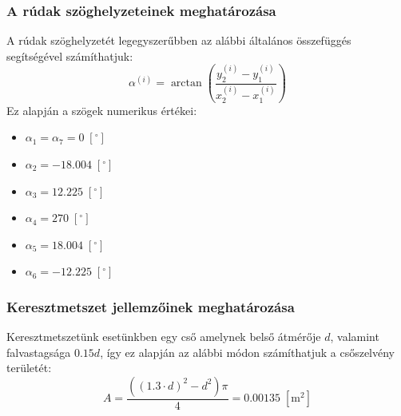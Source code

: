 \documentclass[12pt,a4paper]{article}
\def\deg{\; \left[^{\circ}\right]}
\def\mm{\; \left[\mathrm{m^2}\right]}
\begin{document}
\subsubsection{A rúdak szöghelyzeteinek meghatározása}
A rúdak szöghelyzetét legegyszerűbben az alábbi általános összefüggés
segítségével számíthatjuk:
\begin{equation}
    \boxed{\alpha^{\left(i\right)}=
        \arctan \left( \frac{y^{\left(i\right)}_2-y^{\left(i\right)}_1}
        {x^{\left(i\right)}_2-x^{\left(i\right)}_1}\right)}
\end{equation}
Ez alapján a szögek numerikus értékei:
\begin{multicols}{3}
    \begin{itemize}
        \item $\alpha_1=\alpha_7=0 \deg$
        \item $\alpha_2=-18.004 \deg$
    \end{itemize}
    \columnbreak
    \begin{itemize}
        \item $\alpha_3=12.225 \deg$
        \item $\alpha_4=270 \deg$
    \end{itemize}
    \columnbreak
    \begin{itemize}
        \item $\alpha_5=18.004 \deg$
        \item $\alpha_6=-12.225 \deg$
    \end{itemize}
\end{multicols}
\subsubsection{Keresztmetszet jellemzőinek meghatározása}
Keresztmetszetünk esetünkben egy cső amelynek belső átmérője $d$, valamint falvastagsága
$0.15 d$, így ez alapján az alábbi módon számíthatjuk a csőszelvény területét:
\begin{equation}
    A=\frac{\left(\left(1.3 \cdot d\right)^2-d^2\right) \pi }
    {4}=0.00135 \mm
\end{equation}
\end{document}
